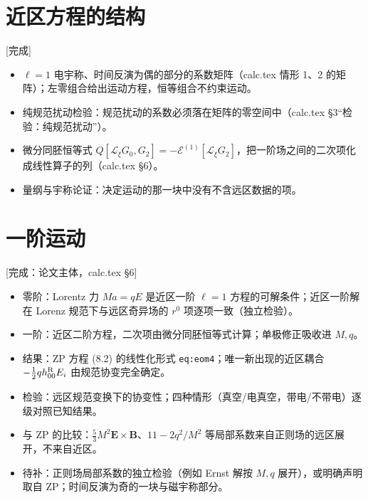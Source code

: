 \documentclass[11pt,a4paper]{ctexart}
\newcommand{\status}[1]{\hfill{\small\color{blue!50!black}[#1]}}
\begin{document}
\section{近区方程的结构}\label{sec:o-structure}
\status{完成}
\begin{itemize}[nosep]
\item $\ell=1$ 电宇称、时间反演为偶的部分的系数矩阵（calc.tex 情形 1、2 的矩阵）；左零组合给出运动方程，恒等组合不约束运动。
\item 纯规范扰动检验：规范扰动的系数必须落在矩阵的零空间中（calc.tex \S3“检验：纯规范扰动”）。
\item 微分同胚恒等式 $Q[\mathcal L_\xi G_0,G_2]=-\mathcal E^{(1)}[\mathcal L_\xi G_2]$，把一阶场之间的二次项化成线性算子的列（calc.tex \S6）。
\item 量纲与宇称论证：决定运动的那一块中没有不含远区数据的项。
\end{itemize}

\section{一阶运动}\label{sec:o-first}
\status{完成：论文主体，calc.tex \S6}
\begin{itemize}[nosep]
\item 零阶：Lorentz 力 $Ma=qE$ 是近区一阶 $\ell=1$ 方程的可解条件；近区一阶解在 Lorenz 规范下与远区奇异场的 $r^0$ 项逐项一致（独立检验）。
\item 一阶：近区二阶方程，二次项由微分同胚恒等式计算；单极修正吸收进 $M,q$。
\item 结果：ZP 方程 (8.2) 的线性化形式 \texttt{eq:eom4}；唯一新出现的近区耦合 $-\tfrac12qh^{\rm R}_{00}E_i$ 由规范协变完全确定。
\item 检验：远区规范变换下的协变性；四种情形（真空/电真空，带电/不带电）逐级对照已知结果。
\item 与 ZP 的比较：$\tfrac53M^2\boldsymbol E\times\boldsymbol B$、$11-2q^2/M^2$ 等局部系数来自正则场的远区展开，不来自近区。
\item 待补：正则场局部系数的独立检验（例如 Ernst 解按 $M,q$ 展开），或明确声明取自 ZP；时间反演为奇的一块与磁宇称部分。
\end{itemize}

\end{document}
